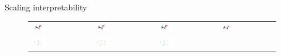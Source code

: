 \begin{frame}{Scaling interpretability}
\begin{figure}[!htp]
    \centering
    \begin{tabular}{p{2.5cm}p{2.5cm}p{2.5cm}p{2.5cm}}
        \includegraphics[width=0.25\textwidth, trim={2cm 3cm 5cm 0cm}, clip]{img/ethanol_g0.png} &
        \includegraphics[width=0.25\textwidth, trim={2cm 3cm 5cm 0cm}, clip]{img/ethanol_g1.png} &
          \includegraphics[width=0.25\textwidth, trim={2cm 3cm 5cm 0cm}, clip]{img/ethanol_g2.png} &
          \includegraphics[width=0.25\textwidth, trim={2cm 3cm 5cm 0cm}, clip]{img/ethanol_g3.png}  \\
        \includegraphics[width=0.25\textwidth, trim={1cm 0cm 4cm 4cm}, clip]{img/ethanol_embedding_0.png} &
        \includegraphics[width=0.25\textwidth, trim={1cm 0cm 4cm 4cm}, clip]{img/ethanol_embedding_1.png} &
         \includegraphics[width=0.25\textwidth, trim={1cm 0cm 4cm 4cm}, clip]{img/ethanol_embedding_2.png}  &

\end{tabular}
\end{figure}
\end{frame}

